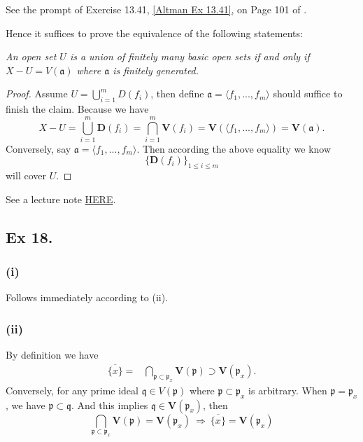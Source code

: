 \smallskip
\medskip

See the prompt of Exercise 13.41, \ref{Altman Ex 13.41}, on Page 101 of \cite{altman}. 
\smallskip

Hence it suffices to prove the equivalence of the following statements:\newline

\textit{An open set $U$ is a union of finitely many basic open sets if and only if $X-U=V(\mathfrak a)$ where $\mathfrak a$ is finitely generated.}
\begin{proof}
Assume $U=\bigcup_{i=1}^m D(f_i)$, then define $\mathfrak a=\langle f_1,...,f_m\rangle$ should suffice to finish the claim. Because we have 
\[X-U=\bigcup_{i=1}^m \mathbf D(f_i)=\bigcap_{i=1}^m \mathbf V(f_i)=\mathbf V(\langle f_1,...,f_m\rangle)=\mathbf V(\mathfrak a).\]
Conversely, say $\mathfrak a=\langle f_1,...,f_m\rangle$. Then according the above equality we know \[\{\mathbf D(f_i)\}_{1\leq i\leq m}\] will cover $U$.
\end{proof}
See a lecture note \href{https://math.stanford.edu/~conrad/Perfseminar/Notes/L3.pdf}{HERE}.



\subsection{Ex 18.}\label{Atiyah Chapter 1 Ex 18.}

\subsubsection{(i)}

Follows immediately according to (ii).

\subsubsection{(ii)}

By definition we have \begin{align*}
    \overline{\{x\}} =& \bigcap_{\mathfrak p\subset \mathfrak p_x} \mathbf V(\mathfrak p) \supset \mathbf V(\mathfrak p_x).
\end{align*}Conversely, for any prime ideal $\mathfrak q\in V(\mathfrak p)$ where $\mathfrak p\subset \mathfrak p_x$ is arbitrary. When $\mathfrak p=\mathfrak p_x$, we have $\mathfrak p\subset \mathfrak q$. And this implies $\mathfrak q\in \mathbf V(\mathfrak p_x)$, then 
\[\bigcap_{\mathfrak p\subset \mathfrak p_x} \mathbf V(\mathfrak p) = \mathbf V(\mathfrak p_x) ~\Rightarrow~ \overline{\{x\}} = \mathbf V(\mathfrak p_x)\]

